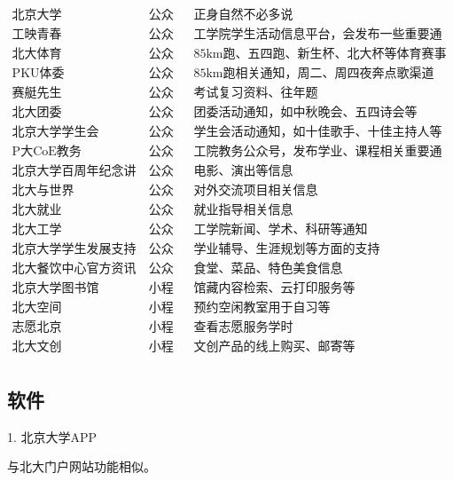 \documentclass[11pt,oneside]{book}
\begin{document}
\[
\begin{matrix}
    \text{北京大学} & \text{公众号} & \text{正身自然不必多说}\\
    \text{工映青春} & \text{公众号} & \text{工学院学生活动信息平台，会发布一些重要通知}\\
    \text{北大体育} & \text{公众号} & \text{85km跑、五四跑、新生杯、北大杯等体育赛事通知}\\
    \text{PKU体委} & \text{公众号} & \text{85km跑相关通知，周二、周四夜奔点歌渠道}\\
    \text{赛艇先生} & \text{公众号} & \text{考试复习资料、往年题}\\
    \text{北大团委} & \text{公众号} & \text{团委活动通知，如中秋晚会、五四诗会等}\\
    \text{北京大学学生会} & \text{公众号} & \text{学生会活动通知，如十佳歌手、十佳主持人等}\\
    \text{P大CoE教务} & \text{公众号} & \text{工院教务公众号，发布学业、课程相关重要通知}\\
    \text{北京大学百周年纪念讲堂} & \text{公众号} & \text{电影、演出等信息}\\
    \text{北大与世界} & \text{公众号} & \text{对外交流项目相关信息}\\
    \text{北大就业} & \text{公众号} & \text{就业指导相关信息}\\
    \text{北大工学} & \text{公众号} & \text{工学院新闻、学术、科研等通知}\\
    \text{北京大学学生发展支持} & \text{公众号} & \text{学业辅导、生涯规划等方面的支持}\\
    \text{北大餐饮中心官方资讯} & \text{公众号} & \text{食堂、菜品、特色美食信息}\\
    \text{北京大学图书馆} & \text{小程序} & \text{馆藏内容检索、云打印服务等}\\
    \text{北大空间} & \text{小程序} & \text{预约空闲教室用于自习等}\\
    \text{志愿北京} & \text{小程序} & \text{查看志愿服务学时}\\
    \text{北大文创} & \text{小程序} & \text{文创产品的线上购买、邮寄等}\\
\end{matrix}
\]

\subsection{软件}

1. 北京大学APP

与北大门户网站功能相似。
\end{document}

